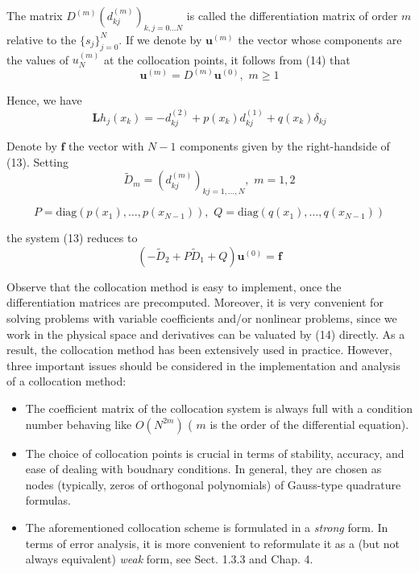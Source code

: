 The matrix $ D^{ (m) } \left( d_{ kj }^{ (m) } \right)_{ k,j=0 \ldots N } $ is called the differentiation matrix of order $ m $ relative to the $ \{ s_{ j } \}_{ j=0 }^{ N } $. If we denote by $ \mathbf{ u }^{ (m) } $ the vector whose components are the values of $ u_{ N }^{ (m) } $ at the collocation points, it follows from (14) that 
\begin{equation}
	\mathbf{ u }^{ (m) } = D^{ (m) } \mathbf{ u }^{ (0) }, \hspace{4pt} m \geq 1
\end{equation}

Hence, we have
\begin{equation}
	\mathbf{ L } h_{ j } \left( x_{ k } \right) = - d^{ (2) }_{ kj } + p(x_{ k }) d^{ (1) }_{ kj } + q\left( x_{ k } \right) \delta_{ kj }
\end{equation}

Denote by $ \mathbf{ f } $ the vector with $ N-1 $ components given by the right-handside of (13). Setting
\begin{equation}
	\tilde{D}_{ m } = \left( d_{ kj }^{ (m) } \right)_{ kj=1,\ldots,N }, \hspace{4pt} m=1,2
\end{equation}

\[
	P = \mathrm{diag} \left( p(x_{ 1 }), \ldots, p(x_{ N-1 }) \right), \hspace{4pt} Q = \mathrm{ diag } \left( q(x_{ 1 }), \ldots, q(x_{ N-1 }) \right)
\]

the system (13) reduces to
\begin{equation}
	\left( - \tilde{D}_{ 2 } + P \tilde{D}_{ 1 } + Q \right) \mathbf{ u }^{ (0) } = \mathbf{ f }
\end{equation}

Observe that the collocation method is easy to implement, once the differentiation matrices are precomputed. Moreover, it is very convenient for solving problems with variable coefficients and/or nonlinear problems, since we work in the physical space and derivatives can be valuated by (14) directly. As a result, the collocation method has been extensively used in practice. However, three important issues should be considered in the implementation and analysis of a collocation method:

\begin{itemize}
	\item The coefficient matrix of the collocation system is always full with a condition number behaving like $ O\left( N^{ 2m } \right) $ ( $ m $ is the order of the differential equation).
	\item The choice of collocation points is crucial in terms of stability, accuracy, and ease of dealing with boudnary conditions. In general, they are chosen as nodes (typically, zeros of orthogonal polynomials) of Gauss-type quadrature formulas.
	\item The aforementioned collocation scheme is formulated in a \textit{strong} form. In terms of error analysis, it is more convenient to reformulate it as a (but not always equivalent) \textit{weak} form, see Sect. 1.3.3 and Chap. 4.
\end{itemize}



